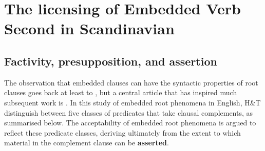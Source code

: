\documentclass[output=paper]{LSP/langsci}
\begin{document}
\section{The licensing of Embedded Verb Second in Scandinavian}

\subsection{Factivity, presupposition, and assertion}
\label{sec:factivity}

The observation that embedded clauses can have the syntactic properties of root clauses goes back at least to \cite{emonds70}, but a central article that has inspired much subsequent work is \cite{hooper-thompson73}. In this study of embedded root phenomena in English, H\&T distinguish between five classes of predicates that take clausal complements, as summarised below.  The acceptability of embedded root phenomena is argued to reflect these predicate classes, deriving ultimately from the extent to which material in the complement clause can be \textbf{asserted}.
\end{document}
